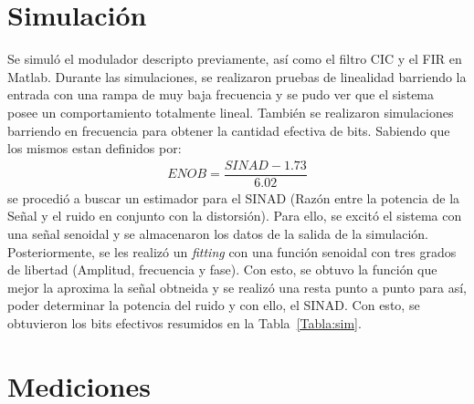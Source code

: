 \documentclass[a4paper,conference]{IEEEtran}
\begin{document}
\section{Simulaci\'on}
Se simul\'o el modulador descripto previamente, as\'i como el filtro CIC y el FIR en Matlab\textregistered.
Durante las simulaciones, se realizaron pruebas de linealidad barriendo la entrada con una rampa de muy baja frecuencia y se pudo ver que el sistema posee un comportamiento totalmente lineal.
Tambi\'en se realizaron simulaciones barriendo en frecuencia para obtener la cantidad efectiva de bits. Sabiendo que los mismos estan definidos por: 
\begin{align}
ENOB = \dfrac{SINAD-1.73}{6.02}
\end{align}
se procedió a buscar un estimador para el SINAD (Razón entre la potencia de la Se\~nal y el ruido en conjunto con la distorsi\'on). Para ello, se excitó el sistema con una señal senoidal y se almacenaron los datos de la salida de la simulación. Posteriormente, se les realizó un \textit{fitting} con una función senoidal con tres grados de libertad (Amplitud, frecuencia y fase). Con esto, se obtuvo la función que mejor la aproxima la señal obtneida y se realizó una resta punto a punto para así, poder determinar la potencia del ruido y con ello, el SINAD. Con esto, se obtuvieron los bits efectivos resumidos en la Tabla~\ref{Tabla:sim}.


\section{Mediciones}
\end{document}
